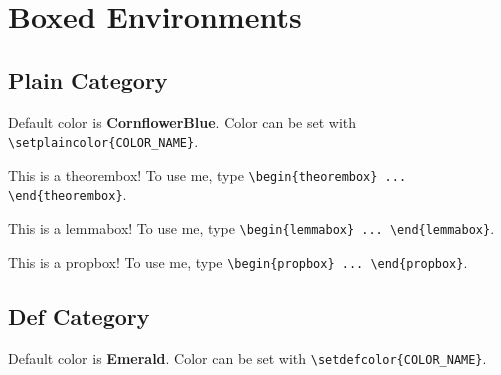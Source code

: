 \documentclass{scrartcl}
\begin{document}
\newpage

\section{Boxed Environments}

\subsection{Plain Category}
Default color is \textbf{CornflowerBlue}. Color can be set with \verb#\setplaincolor{COLOR_NAME}#.

\begin{theorembox}
    This is a theorembox! To use me, type \verb#\begin{theorembox} ... \end{theorembox}#.
\end{theorembox}
\begin{lemmabox}
    This is a lemmabox! To use me, type \verb#\begin{lemmabox} ... \end{lemmabox}#.
\end{lemmabox}
\begin{propbox}
    This is a propbox! To use me, type \verb#\begin{propbox} ... \end{propbox}#.
\end{propbox}

\subsection{Def Category}

Default color is \textbf{Emerald}. Color can be set with \verb#\setdefcolor{COLOR_NAME}#.
\end{document}
